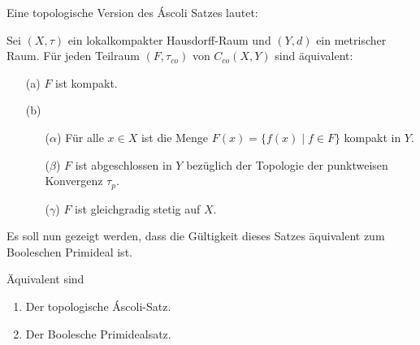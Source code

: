 Eine topologische Version des Áscoli Satzes lautet:
\begin{defn}
  Sei $(X,\tau)$ ein lokalkompakter Hausdorff-Raum und $(Y,d)$ ein metrischer Raum.
  Für jeden Teilraum $(F,\tau_{co})$ von $C_{co}(X,Y)$ sind äquivalent:
  \begin{enumerate}
    \item[(a)] $F$ ist kompakt.
    \item[(b)] \begin{enumerate}
        \item[($\alpha$)] Für alle $x \in X$ ist die Menge $F(x) = \{f(x) \mid f \in F \}$ kompakt in $Y$.
        \item[($\beta$)]  $F$ ist abgeschlossen in $Y$ bezüglich der Topologie der punktweisen Konvergenz $\tau_p$.
        \item[($\gamma$)] $F$ ist gleichgradig stetig auf $X$.
      \end{enumerate}
  \end{enumerate}
\end{defn}

Es soll nun gezeigt werden, dass die Gültigkeit dieses Satzes äquivalent zum Booleschen Primideal ist.

\begin{thm}
  Äquivalent sind
  \begin{enumerate}
    \item Der topologische Áscoli-Satz.
    \item Der Boolesche Primidealsatz.
  \end{enumerate}
\end{thm}

